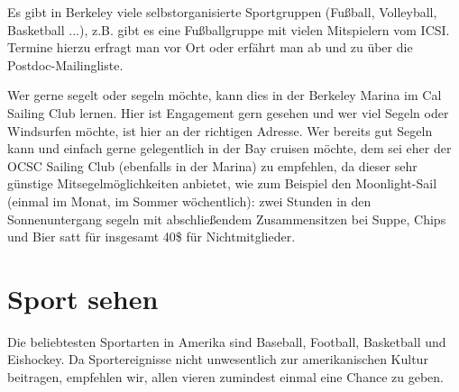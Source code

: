 \documentclass[a4paper]{scrreprt}
\begin{document}
Es gibt in Berkeley viele selbstorganisierte Sportgruppen (Fußball,
Volleyball, Basketball ...), z.B. gibt es eine Fußballgruppe mit
vielen Mitspielern vom ICSI. Termine hierzu erfragt man vor Ort oder
erfährt man ab und zu über die Postdoc-Mailingliste.

Wer gerne segelt oder segeln möchte, kann dies in der Berkeley Marina
im Cal Sailing Club lernen. Hier ist Engagement gern gesehen und wer
viel Segeln oder Windsurfen möchte, ist hier an der richtigen
Adresse. Wer bereits gut Segeln kann und einfach gerne gelegentlich in
der Bay cruisen möchte, dem sei eher der OCSC Sailing Club (ebenfalls
in der Marina) zu empfehlen, da dieser sehr günstige
Mitsegelmöglichkeiten anbietet, wie zum Beispiel den Moonlight-Sail
(einmal im Monat, im Sommer wöchentlich): zwei Stunden in den
Sonnenuntergang segeln mit abschließendem Zusammensitzen bei Suppe,
Chips und Bier satt für insgesamt 40\$ für Nichtmitglieder.

\section{Sport sehen}

Die beliebtesten Sportarten in Amerika sind Baseball, Football, Basketball und Eishockey. Da Sportereignisse nicht unwesentlich zur amerikanischen Kultur beitragen, empfehlen wir, allen vieren zumindest einmal eine Chance zu geben.
\end{document}
